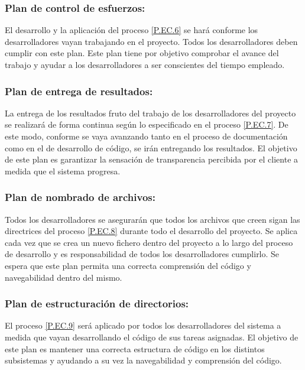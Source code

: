 \documentclass{article}
\begin{document}
\subsubsection{Plan de control de esfuerzos:} \label{PL.EC.4}

El desarrollo y la aplicación del proceso \ref{P.EC.6} se hará conforme los desarrolladores vayan trabajando en el proyecto. Todos los desarrolladores deben cumplir con este plan. Este plan tiene por objetivo comprobar el avance del trabajo y ayudar a los desarrolladores a ser conscientes del tiempo empleado.

\subsubsection{Plan de entrega de resultados:} \label{PL.EC.5}

La entrega de los resultados fruto del trabajo de los desarrolladores del proyecto se realizará de forma continua según lo especificado en el proceso \ref{P.EC.7}. De este modo, conforme se vaya avanzando tanto en el proceso de documentación como en el de desarrollo de código, se irán entregando los resultados.
El objetivo de este plan es garantizar la sensación de transparencia percibida por el cliente a medida que el sistema progresa.

\subsubsection{Plan de nombrado de archivos:} \label{PL.EC.6}

Todos los desarrolladores se asegurarán que todos los archivos que creen sigan las directrices del proceso \ref{P.EC.8} durante todo el desarrollo del proyecto. Se aplica cada vez que se crea un nuevo fichero dentro del proyecto a lo largo del proceso de desarrollo y es responsabilidad de todos los desarrolladores cumplirlo. Se espera que este plan permita una correcta comprensión del código y navegabilidad dentro del mismo.

\subsubsection{Plan de estructuración de directorios: } \label{PL.EC.7}

El proceso \ref{P.EC.9} será aplicado por todos los desarrolladores del sistema a medida que vayan desarrollando el código de sus tareas asignadas. El objetivo de este plan es mantener una correcta estructura de código en los distintos subsistemas y ayudando a su vez la navegabilidad y comprensión del código.
\end{document}
